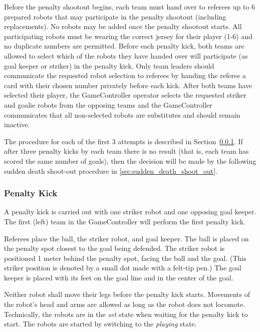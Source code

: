 \documentclass[12pt]{article}
\begin{document}
Before the penalty shootout begins, each team must hand over to referees up to 6 prepared robots that may participate in the penalty shootout (including replacements). No robots may be added once the penalty shootout starts. All participating robots must be wearing the correct jersey for their player (1-6) and no duplicate numbers are permitted. Before each penalty kick, both teams are allowed to select which of the robots they have handed over will participate (as goal keeper or striker) in the penalty kick. Only team leaders should communicate the requested robot selection to referees by handing the referee a card with their chosen number privately before each kick. After both teams have selected their player, the GameController operator selects the requested striker and goalie robots from the opposing teams and the GameController communicates that all non-selected robots are substitutes and should remain inactive.

The procedure for each of the first 3 attempts is described in Section~\ref{sec:penalty_kick}. If after three penalty kicks by each team there is no result (that is, each team has scored the same number of goals), then the decision will be made by the following sudden death shoot-out procedure in \ref{sec:sudden_death_shoot_out}.

\subsubsection{Penalty Kick}
\label{sec:penalty_kick}

A penalty kick is carried out with one striker robot and one opposing goal keeper. The first (left) team in the GameController will perform the first penalty kick.

Referees place the ball, the striker robot, and goal keeper. The ball is placed on the penalty spot closest to the goal being defended. The striker robot is positioned 1 meter behind the penalty spot, facing the ball and the goal. (This striker position is denoted by a small dot made with a felt-tip pen.) The goal keeper is placed with its feet on the goal line and in the center of the goal.

Neither robot shall move their legs before the penalty kick starts. Movements of the robot's head and arms are allowed as long as the robot does not locomote. Technically, the robots are in the \emph{set} state when waiting for the penalty kick to start. The robots are started by switching to the \emph{playing} state. 
\end{document}
